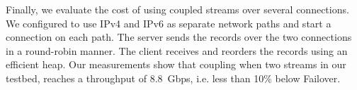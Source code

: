 
Finally, we evaluate the cost of using coupled streams over several \tcp connections.
We configured \tcpls to use IPv4 and IPv6 as separate network paths and start a
\tcp connection on each path.
The \tcpls server sends the records over the two \tcp connections in a
round-robin manner. The \tcpls client receives and reorders the records using
an efficient heap.
Our measurements show that coupling when two streams in our testbed, \tcpls reaches a throughput of 8.8~Gbps, i.e. less than 10\% below Failover.

